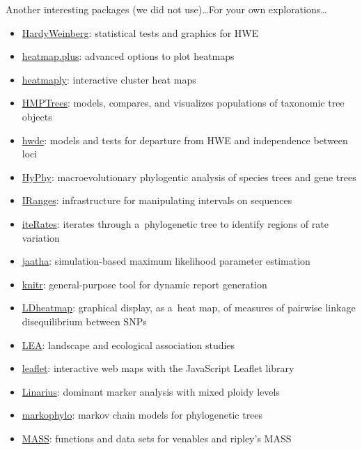 \documentclass[compress, ucs, xelatex, 11pt, xcolor=svgnames, aspectratio=169,
	hyperref={
		bookmarks=true,
		unicode=true,
		colorlinks=true,
		pdftitle={Molecular data in R},
		plainpages=false,
		pdfauthor={Vojtech Zeisek},
		pdfsubject={Course about phylogeny and evolution in R},
		pdfcreator={XeLaTeX},
		pdfkeywords={R, evolution, phylogeny, molecular data},
		linkcolor=Crimson, %
		anchorcolor=Magenta, %
		citecolor=Magenta, %
		filecolor=Magenta, %
		menucolor=Magenta, %
		urlcolor=DodgerBlue, %
		pdftex},
	url={hyphens, lowtilde} %
	]{beamer}
\begin{document}
\begin{frame}[allowframebreaks]{Another interesting packages (we did not use)\ldots}{For your own explorations\ldots}
\begin{itemize}
		\item \href{https://CRAN.R-project.org/package=HardyWeinberg}{HardyWeinberg}: statistical tests and graphics for HWE
		\item \href{https://CRAN.R-project.org/package=heatmap.plus}{heatmap.plus}: advanced options to plot heatmaps
		\item \href{https://CRAN.R-project.org/package=heatmaply}{heatmaply}: interactive cluster heat maps
		\item \href{https://CRAN.R-project.org/package=HMPTrees}{HMPTrees}: models, compares, and visualizes populations of taxonomic tree objects
		\item \href{https://CRAN.R-project.org/package=hwde}{hwde}: models and tests for departure from HWE and independence between loci
		\item \href{https://CRAN.R-project.org/package=HyPhy}{HyPhy}: macroevolutionary phylogentic analysis of species trees and gene trees
		\item \href{https://bioconductor.org/packages/release/bioc/html/IRanges.html}{IRanges}: infrastructure for manipulating intervals on sequences
		\item \href{https://CRAN.R-project.org/package=iteRates}{iteRates}: iterates through a~phylogenetic tree to identify regions of rate variation
		\item \href{https://CRAN.R-project.org/package=jaatha}{jaatha}: simulation-based maximum likelihood parameter estimation
		\item \href{https://CRAN.R-project.org/package=knitr}{knitr}: general-purpose tool for dynamic report generation
		\item \href{https://CRAN.R-project.org/package=LDheatmap}{LDheatmap}: graphical display, as a~heat map, of measures of pairwise linkage disequilibrium between SNPs
		\item \href{https://www.bioconductor.org/packages/release/bioc/html/LEA.html}{LEA}: landscape and ecological association studies
		\item \href{https://CRAN.R-project.org/package=leaflet}{leaflet}: interactive web maps with the JavaScript Leaflet library
		\item \href{https://github.com/giby/Linarius}{Linarius}: dominant marker analysis with mixed ploidy levels
		\item \href{https://CRAN.R-project.org/package=markophylo}{markophylo}: markov chain models for phylogenetic trees
		\item \href{https://CRAN.R-project.org/package=MASS}{MASS}: functions and data sets for venables and ripley's MASS

\end{itemize}
\end{frame}
\end{document}
